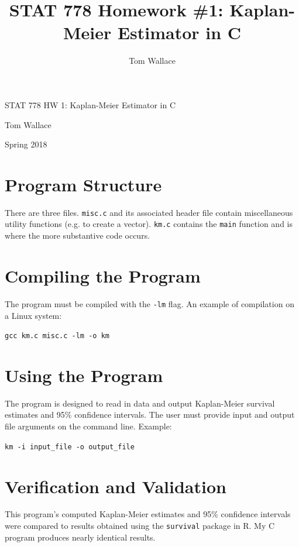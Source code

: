 \documentclass{article}
\title{STAT 778 Homework \#1: Kaplan-Meier Estimator in C\vspace{-2ex}}
\author{Tom Wallace}
\begin{document}

\begin{center}
\LARGE STAT 778 HW 1: Kaplan-Meier Estimator in C

\large Tom Wallace

\large Spring 2018
\end{center}

\section{Program Structure}
There are three files. \texttt{misc.c} and its associated header file contain
miscellaneous utility functions (e.g. to create a vector). \texttt{km.c} contains
the \texttt{main} function and is where the more substantive code occurs.

\section{Compiling the Program}
The program must be compiled
with the \texttt{-lm} flag. An example of compilation on a Linux system:

\begin{center}
\texttt{gcc km.c misc.c -lm -o km}
\end{center}

\section{Using the Program}
The program is designed to read in data and output Kaplan-Meier survival
estimates and 95\% confidence intervals. The user must provide input and output
file arguments on the command line. Example:

\begin{center}
\texttt{km -i input\_file -o output\_file}
\end{center}

\section{Verification and Validation}
This program's computed Kaplan-Meier estimates and 95\% confidence intervals 
were compared to results obtained using the \texttt{survival} package in R. 
My C program produces nearly identical results.
\end{document}
